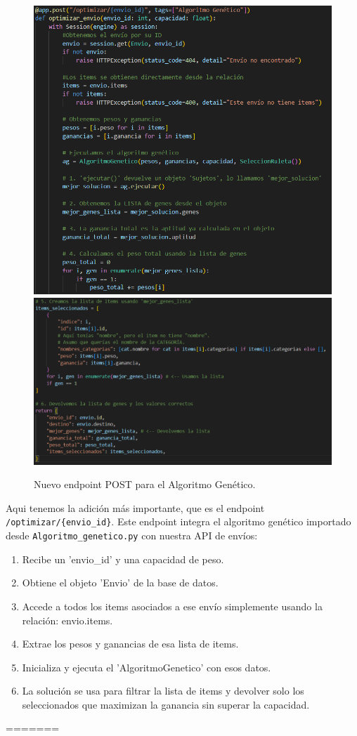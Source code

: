 \documentclass[12pt]{article}
\begin{document}
\begin{figure}[H]
    \centering
    \includegraphics[width=1\textwidth]{Imagenes/Prac4_5.1.png}
    \includegraphics[width=1\textwidth]{Imagenes/Prac4_5.2.png}
    \caption{Nuevo endpoint POST para el Algoritmo Genético.}
\end{figure}

Aqui tenemos la adición más importante, que es el endpoint \texttt{/optimizar/\{envio\_id\}}. Este endpoint integra el algoritmo genético importado desde \texttt{Algoritmo\_genetico.py} con nuestra API de envíos:
\begin{enumerate}
    \item Recibe un 'envio\_id' y una capacidad de peso.
    \item Obtiene el objeto 'Envio' de la base de datos.
    \item Accede a todos los items asociados a ese envío simplemente usando la relación: envio.items.
    \item Extrae los pesos y ganancias de esa lista de items.
    \item Inicializa y ejecuta el 'AlgoritmoGenetico' con esos datos.
    \item La solución se usa para filtrar la lista de items y devolver solo los seleccionados que maximizan la ganancia sin superar la capacidad.
\end{enumerate}
=======
\end{document}
